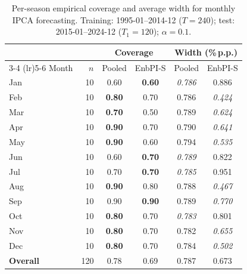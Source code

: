 \begin{table}[ht]
\centering
\caption{Per-season empirical coverage and average width for monthly IPCA forecasting.
Training: 1995-01--2014-12 ($T=240$); test: 2015-01--2024-12 ($T_1=120$); $\alpha=0.1$.}
\label{tab:empirical_coverage}
\begin{tabular}{l r cc cc}
\toprule
 & & \multicolumn{2}{c}{Coverage} & \multicolumn{2}{c}{Width (\%\,p.p.)} \\
\cmidrule(lr){3-4} \cmidrule(lr){5-6}
Month & $n$ & Pooled & EnbPI-S & Pooled & EnbPI-S \\
\midrule
Jan & 10 & 0.60 & \textbf{0.60} & \textit{0.786} & 0.886 \\
Feb & 10 & \textbf{0.80} & 0.70 & 0.786 & \textit{0.424} \\
Mar & 10 & \textbf{0.70} & 0.50 & 0.789 & \textit{0.624} \\
Apr & 10 & \textbf{0.90} & 0.70 & 0.790 & \textit{0.641} \\
May & 10 & \textbf{0.90} & 0.60 & 0.794 & \textit{0.535} \\
Jun & 10 & 0.60 & \textbf{0.70} & \textit{0.789} & 0.822 \\
Jul & 10 & 0.70 & \textbf{0.70} & \textit{0.785} & 0.951 \\
Aug & 10 & \textbf{0.90} & 0.80 & 0.788 & \textit{0.467} \\
Sep & 10 & 0.90 & \textbf{0.90} & 0.789 & \textit{0.770} \\
Oct & 10 & \textbf{0.80} & 0.70 & \textit{0.783} & 0.801 \\
Nov & 10 & \textbf{0.80} & 0.70 & 0.782 & \textit{0.655} \\
Dec & 10 & \textbf{0.80} & 0.70 & 0.784 & \textit{0.502} \\
\midrule
\textbf{Overall} & 120 & 0.78 & 0.69 & 0.787 & 0.673 \\
\bottomrule
\end{tabular}
\end{table}